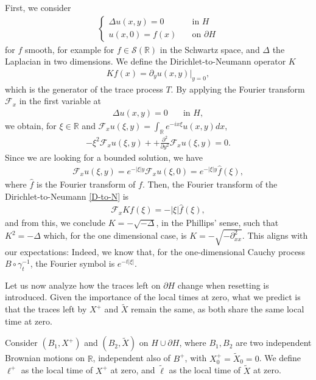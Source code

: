 \documentclass[11pt,a4paper]{article}
\theoremstyle{definition}
\theoremstyle{remark}
\begin{document}
First, we consider
\begin{align*}
	\begin{cases}
		\Delta u(x,y)=0 \quad & \text{in } H\\
		u(x,0) =f(x)  \quad &\text{on } \partial H
	\end{cases}
\end{align*}
for $f$ smooth, for example for $f \in \mathcal{S}(\mathbb{R})$ in the Schwartz space, and $\Delta$ the Laplacian in two dimensions. We define the Dirichlet-to-Neumann operator $K$
\begin{align}
	\label{D-to-N}
	K f(x)= \partial_y u(x,y) \big\vert_{y=0},
\end{align}
which is the generator of the trace process $T$. By applying the Fourier transform $\mathcal{F}_x$ in the first variable at
\begin{align*}
	\Delta u(x,y)=0 \quad & \text{in } H,
\end{align*}
we obtain, for $\xi \in \mathbb{R}$ and \(\mathcal{F}_x u (\xi, y)= \int_\mathbb{R} e^{-i x \xi} u(x,y) dx\),
\begin{align*}
	- \xi^2 \mathcal{F}_x u(\xi, y) + + \frac{\partial^2}{\partial y^2} \mathcal{F}_x u(\xi,y)=0.
\end{align*}
Since we are looking for a bounded solution, we have 
\begin{align*}
	\mathcal{F}_x u (\xi, y)= e^{-\vert \xi \vert y} \mathcal{F}_x u(\xi, 0)= e^{-\vert \xi \vert y} \widehat{f}(\xi),
\end{align*}
where $\widehat{f}$ is the Fourier transform of $f$. Then, the Fourier transform of the Dirichlet-to-Neumann \eqref{D-to-N} is
\begin{align*}
	\mathcal{F}_x K f (\xi)= - \vert \xi \vert \widehat{f}(\xi),
\end{align*}
and from this, we conclude $K= -\sqrt{-\Delta}$, in the Phillips' sense, such that $K^2=- \Delta$ which, for the one dimensional case, is $K = - \sqrt{-\partial^2_{xx}}$.
This aligns with our expectations: Indeed, we know that, for the one-dimensional Cauchy process $B \circ \gamma^{-1}_t$, the Fourier symbol is $e^{-t \vert \xi \vert}$.

Let us now analyze how the traces left on $\partial H$ change when resetting is introduced. Given the importance of the local times at zero, what we predict is that the traces left by $X^+$ and $\widetilde{X}$ remain the same, as both share the same local time at zero. 

Consider \((B_1, X^+)\) and \((B_2, \widetilde{X})\) on \( H \cup \partial H \), where \(B_1,B_2\) are two independent Brownian motions on \(\mathbb{R}\), independent also of $B^+$, with \( X^+_0 = \widetilde{X}_0 = 0 \). We define \(\ell^+\) as the local time of \( X^+ \) at zero, and \(\widetilde{\ell}\) as the local time of \( \widetilde{X} \) at zero. 
\end{document}
